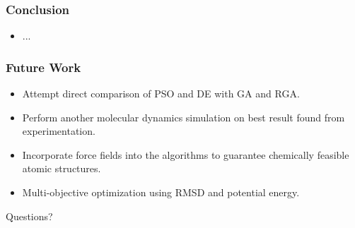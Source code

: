 \documentclass[10pt]{beamer}
\begin{document}


\begin{frame}
	\frametitle{Conclusion}

	\begin{itemize}
		\item ...
	\end{itemize}

\end{frame}

\begin{frame}
	\frametitle{Future Work}

	\begin{itemize}
		\item Attempt direct comparison of PSO and DE with GA and RGA.
		\item Perform another molecular dynamics simulation on best result found from experimentation.
		\item Incorporate force fields into the algorithms to guarantee chemically feasible atomic structures.
		\item Multi-objective optimization using RMSD and potential energy.
	\end{itemize}

\end{frame}

\begin{frame}
	
	\begin{center}
	\Huge Questions?
	\end{center}

\end{frame}
\end{document}
